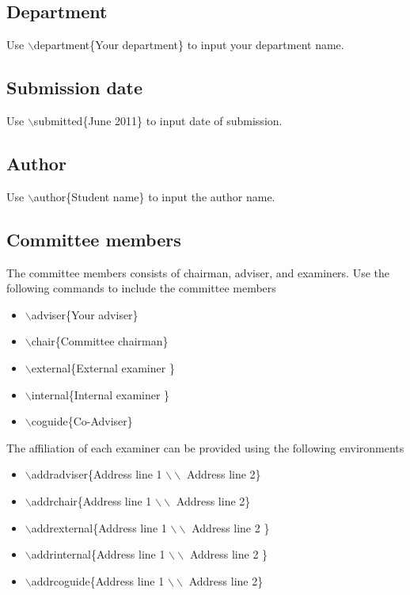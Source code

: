 \documentclass[a4paper,twoside]{iiththesis}
\begin{document}
\subsection{Department}
Use $ \backslash $department\{Your department\} to input your department name.

\subsection{Submission date}
Use $ \backslash $submitted\{June 2011\} to input date of submission.


\subsection{Author}
Use $ \backslash $author\{Student name\} to input the author name.

\subsection{Committee members}
The committee members consists of chairman, adviser, and examiners.  Use the following commands to include the committee members
\begin{itemize}
\item $ \backslash $adviser\{Your adviser\}
\item $ \backslash $chair\{Committee chairman\}
\item $ \backslash $external\{External examiner \}
\item $ \backslash $internal\{Internal examiner \}
\item $ \backslash $coguide\{Co-Adviser\}

\end{itemize}

The affiliation of each examiner can be provided using the following environments
\begin{itemize}
\item $ \backslash $addradviser\{Address line 1 $ \backslash \backslash $ Address line 2\}
\item $ \backslash $addrchair\{Address line 1 $ \backslash \backslash $ Address line 2\}
\item $ \backslash $addrexternal\{Address line 1 $ \backslash \backslash $ Address line 2 \}
\item $ \backslash $addrinternal\{Address line 1 $ \backslash \backslash $ Address line 2 \}
\item $ \backslash $addrcoguide\{Address line 1 $ \backslash \backslash $ Address line 2\}

\end{itemize}
\end{document}

